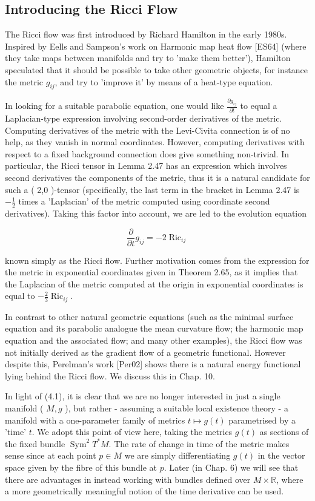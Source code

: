\documentclass[10pt, letterpaper]{article}
\begin{document}
\subsection*{Introducing the Ricci Flow}
The Ricci flow was first introduced by Richard Hamilton in the early 1980s. Inspired by Eells and Sampson's work on Harmonic map heat flow [ES64] (where they take maps between manifolds and try to 'make them better'), Hamilton speculated that it should be possible to take other geometric objects, for instance the metric $g_{i j}$, and try to 'improve it' by means of a heat-type equation.

In looking for a suitable parabolic equation, one would like $\frac{\partial g_{i j}}{\partial t}$ to equal a Laplacian-type expression involving second-order derivatives of the metric. Computing derivatives of the metric with the Levi-Civita connection is of no help, as they vanish in normal coordinates. However, computing derivatives with respect to a fixed background connection does give something non-trivial. In particular, the Ricci tensor in Lemma 2.47 has an expression which involves second derivatives the components of the metric, thus it is a natural candidate for such a ( 2,0 )-tensor (specifically, the last term in the bracket in Lemma 2.47 is $-\frac{1}{2}$ times a 'Laplacian' of the metric computed using coordinate second derivatives). Taking this factor into account, we are led to the evolution equation

$$
\frac{\partial}{\partial t} g_{i j}=-2 \operatorname{Ric}_{i j}
$$

known simply as the Ricci flow. Further motivation comes from the expression for the metric in exponential coordinates given in Theorem 2.65, as it implies that the Laplacian of the metric computed at the origin in exponential coordinates is equal to $-\frac{2}{3} \operatorname{Ric}_{i j}$.

In contrast to other natural geometric equations (such as the minimal surface equation and its parabolic analogue the mean curvature flow; the harmonic map equation and the associated flow; and many other examples), the Ricci flow was not initially derived as the gradient flow of a geometric functional. However despite this, Perelman's work [Per02] shows there is a natural energy functional lying behind the Ricci flow. We discuss this in Chap. 10.

In light of (4.1), it is clear that we are no longer interested in just a single manifold ( $M, g$ ), but rather - assuming a suitable local existence theory - a manifold with a one-parameter family of metrics $t \mapsto g(t)$ parametrised by a 'time' $t$. We adopt this point of view here, taking the metrics $g(t)$ as sections of the fixed bundle $\operatorname{Sym}^{2} T^{*} M$. The rate of change in time of the metric makes sense since at each point $p \in M$ we are simply differentiating $g(t)$ in the vector space given by the fibre of this bundle at $p$. Later (in Chap. 6) we will see that there are advantages in instead working with bundles defined over $M \times \mathbb{R}$, where a more geometrically meaningful notion of the time derivative can be used.
\end{document}
